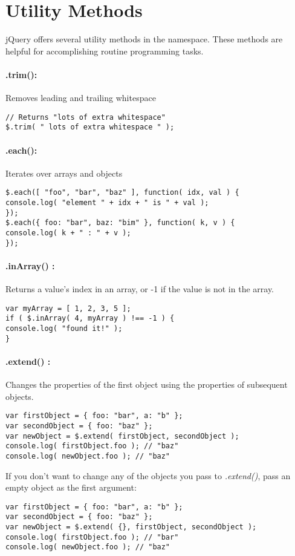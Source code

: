 \documentclass[10pt,letterpaper]{report}
\begin{document}
\section{Utility Methods}
jQuery offers several utility methods in the \textdollar  namespace. These methods are helpful for accomplishing routine programming tasks.

\paragraph{\textdollar.trim():} Removes leading and trailing whitespace
\begin{lstlisting}
// Returns "lots of extra whitespace"
$.trim( " lots of extra whitespace " );
\end{lstlisting}
\paragraph{\textdollar.each():} Iterates over arrays and objects
\begin{lstlisting}
$.each([ "foo", "bar", "baz" ], function( idx, val ) {
console.log( "element " + idx + " is " + val );
});
$.each({ foo: "bar", baz: "bim" }, function( k, v ) {
console.log( k + " : " + v );
});
\end{lstlisting}
\paragraph{\textdollar.inArray() :} Returns a value's index in an array, or -1 if the value is not in the array.
\begin{lstlisting}
var myArray = [ 1, 2, 3, 5 ];
if ( $.inArray( 4, myArray ) !== -1 ) {
console.log( "found it!" );
}
\end{lstlisting}
\paragraph{\textdollar.extend() :} Changes the properties of the first object using the properties of subsequent objects.
\begin{lstlisting}
var firstObject = { foo: "bar", a: "b" };
var secondObject = { foo: "baz" };
var newObject = $.extend( firstObject, secondObject );
console.log( firstObject.foo ); // "baz"
console.log( newObject.foo ); // "baz"
\end{lstlisting}
If you don't want to change any of the objects you pass to \textit{\textdollar.extend()}, pass an empty object as the first argument:
\begin{lstlisting}
var firstObject = { foo: "bar", a: "b" };
var secondObject = { foo: "baz" };
var newObject = $.extend( {}, firstObject, secondObject );
console.log( firstObject.foo ); // "bar"
console.log( newObject.foo ); // "baz"
\end{lstlisting}
\end{document}
